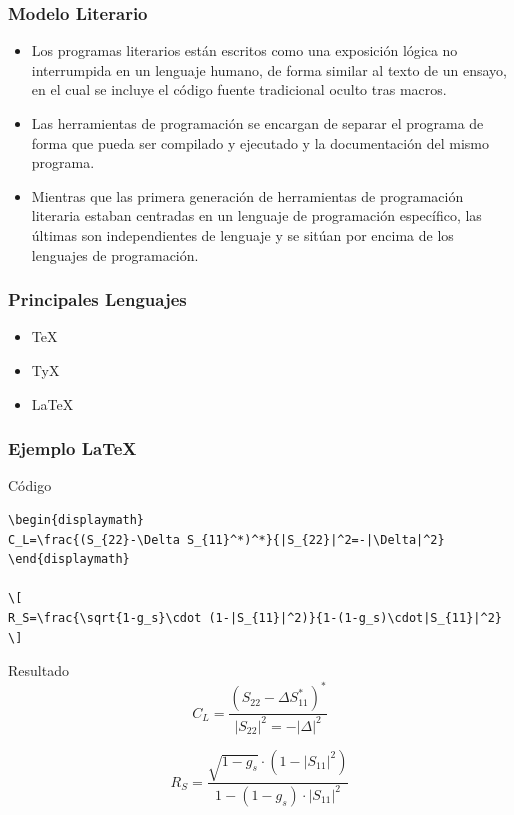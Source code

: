 \documentclass[aspectratio=1610]{beamer}%
\begin{document}
\begin{frame}[fragile]
\frametitle{\textbf{Modelo Literario}}
\justifying
\begin{itemize}\justifying
  \item  Los programas literarios están escritos como una exposición lógica no interrumpida en un lenguaje humano, de forma similar al texto de un ensayo, en el cual se incluye el código fuente tradicional oculto tras macros. 
  \item Las herramientas de programación se encargan de separar el programa de forma que pueda ser compilado y ejecutado y la documentación del mismo programa. 
  \item Mientras que las primera generación de herramientas de programación literaria estaban centradas en un lenguaje de programación específico, las últimas son independientes de lenguaje y se sitúan por encima de los lenguajes de programación.
\end{itemize}


\end{frame}

\begin{frame}[fragile]
\frametitle{\textbf{Principales Lenguajes}}
\justifying
 \begin{itemize}\justifying
  \item \TeX{}
  \item TyX
  \item \LaTeX{}
\end{itemize}

\end{frame}


\begin{frame}[fragile]
\frametitle{\textbf{Ejemplo \LaTeX{}}}
\justifying
 \begin{block}{Código}
   \lstset{language=TEX,basicstyle=\small}
   \vspace{-0.8cm}
\begin{lstlisting}
\begin{displaymath}
C_L=\frac{(S_{22}-\Delta S_{11}^*)^*}{|S_{22}|^2=-|\Delta|^2}
\end{displaymath}
    
\[
R_S=\frac{\sqrt{1-g_s}\cdot (1-|S_{11}|^2)}{1-(1-g_s)\cdot|S_{11}|^2}
\]
\end{lstlisting}\vspace{-0.3cm}

\end{block}


\begin{exampleblock}{Resultado}
\begin{displaymath}
C_L=\frac{(S_{22}-\Delta S_{11}^*)^*}{|S_{22}|^2=-|\Delta|^2}
\end{displaymath}
    
\[
R_S=\frac{\sqrt{1-g_s}\cdot (1-|S_{11}|^2)}{1-(1-g_s)\cdot|S_{11}|^2}
\]

\end{exampleblock}

\end{frame}
\end{document}
